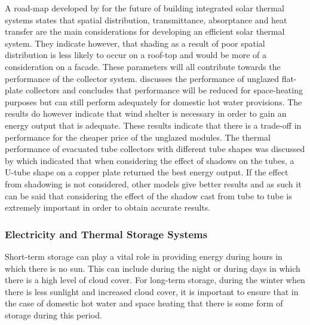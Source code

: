 A road-map developed by \cite{MAURER2015704}
for the future of building integrated solar
thermal systems states that spatial distribution, transmittance, absorptance 
and heat transfer are the main considerations for developing an efficient 
solar thermal system. They indicate however, that shading as a result of poor 
spatial distribution is less likely to occur on a roof-top and would be more 
of a consideration on a facade. These parameters will all contribute towards 
the performance of the collector system. \cite{BONHOTE2009799} discusses the performance of 
unglazed flat-plate collectors and concludes that performance will be reduced 
for space-heating purposes but can still perform adequately for domestic hot 
water provisions. The results do however indicate that wind shelter is 
necessary in order to gain an energy output that is adequate. These results 
indicate that there is a trade-off in performance for the cheaper price of 
the unglazed modules. The thermal performance of evacuated tube collectors 
with different tube shapes was discussed by \cite{KIM2007772} which indicated that when 
considering the effect of shadows on the tubes, a U-tube shape on a copper 
plate returned the best energy output. If the effect from shadowing is not 
considered, other models give better results and as such it can be said that 
considering the effect of the shadow cast from tube to tube is extremely 
important in order to obtain accurate results.

\subsubsection{Electricity and Thermal Storage Systems}

Short-term storage can play a vital role in providing energy during hours in which there is no sun. This can include during the night or during days in which there is a high level of cloud cover. For long-term storage, during the winter when there is less 
sunlight and increased cloud cover, it is important to ensure that in the 
case of domestic hot water and space heating that there is some form of 
storage during this period.

